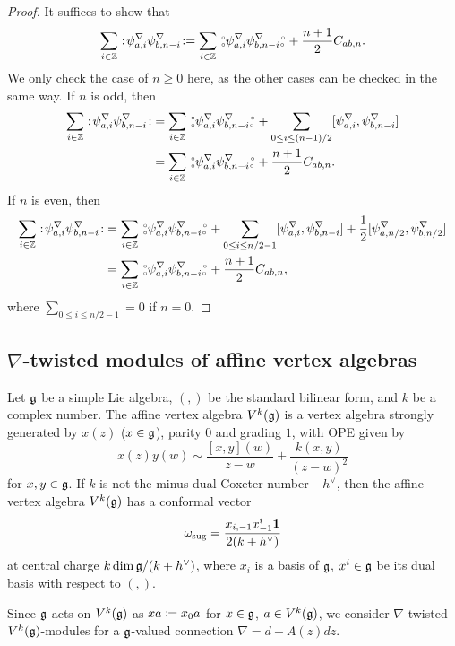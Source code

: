 \documentclass[final,reqno]{amsart}
\begin{document}
\begin{proof}
    It suffices to show that 
    \[
        \sum_{i\in\mathbb{Z}}:\!\psi^\nabla_{a,i}\psi^\nabla_{b,n-i}\!:=\sum_{i\in\mathbb{Z}}\,\substack{\scriptscriptstyle\circ \\ \scriptscriptstyle\circ} \psi^\nabla_{a,i}\psi^\nabla_{b,n-i} \substack{\scriptscriptstyle\circ \\ \scriptscriptstyle\circ\,}+\frac{n+1}{2}C_{ab,n}.
    \]    
    We only check the case of $n\geq 0$ here, as the other cases can be checked in the same way. If $n$ is odd, then
    \begin{align*}
        \sum_{i\in\mathbb{Z}}:\!\psi^\nabla_{a,i}\psi^\nabla_{b,n-i}\!:
        &=\sum_{i\in\mathbb{Z}}\,\substack{\scriptscriptstyle\circ \\ \scriptscriptstyle\circ} \psi^\nabla_{a,i}\psi^\nabla_{b,n-i} \substack{\scriptscriptstyle\circ \\ \scriptscriptstyle\circ\,}+\sum_{0\leq i\leq (n-1)/2}[\psi^\nabla_{a,i},\psi^\nabla_{b,n-i}]\\
        &=\sum_{i\in\mathbb{Z}}\,\substack{\scriptscriptstyle\circ \\ \scriptscriptstyle\circ} \psi^\nabla_{a,i}\psi^\nabla_{b,n-i} \substack{\scriptscriptstyle\circ \\ \scriptscriptstyle\circ\,}+\frac{n+1}{2}C_{ab,n}.
    \end{align*}
    If $n$ is even, then
    \begin{align*}
        \sum_{i\in\mathbb{Z}}:\!\psi^\nabla_{a,i}\psi^\nabla_{b,n-i}\!:
        &=\sum_{i\in\mathbb{Z}}\,\substack{\scriptscriptstyle\circ \\ \scriptscriptstyle\circ} \psi^\nabla_{a,i}\psi^\nabla_{b,n-i} \substack{\scriptscriptstyle\circ \\ \scriptscriptstyle\circ\,}+\sum_{0\leq i\leq n/2-1}[\psi^\nabla_{a,i},\psi^\nabla_{b,n-i}]+\frac{1}{2}[\psi^\nabla_{a,n/2},\psi^\nabla_{b,n/2}]\\
        &=\sum_{i\in\mathbb{Z}}\,\substack{\scriptscriptstyle\circ \\ \scriptscriptstyle\circ} \psi^\nabla_{a,i}\psi^\nabla_{b,n-i} \substack{\scriptscriptstyle\circ \\ \scriptscriptstyle\circ\,}+\frac{n+1}{2}C_{ab,n},
    \end{align*}
    where $\sum_{0\leq i\leq n/2-1}=0$ if $n=0$.
\end{proof}

\subsection{$\nabla$-twisted modules of affine vertex algebras}\label{ss:affine va}
\begin{dfn}
    Let $\mathfrak{g}$ be a simple Lie algebra, $(,)$ be the standard bilinear form, and $k$ be a complex number. The affine vertex algebra $V^k(\mathfrak{g})$ is a vertex algebra strongly generated by $x(z)$ ($x\in\mathfrak{g}$), parity $0$ and grading $1$, with OPE given by
    \[
        x(z)y(w)\sim \frac{[x,y](w)}{z-w}+\frac{k(x,y)}{(z-w)^2}
    \]
    for $x,y\in\mathfrak{g}$. If $k$ is not the minus dual Coxeter number $-h^\vee$, then the affine vertex algebra $V^k(\mathfrak{g})$ has a conformal vector 
    \[
        \omega_\mathrm{sug}=\frac{x_{i,-1}x^i_{-1}\mathbf{1}}{2(k+h^\vee)}
    \]
    at central charge $k\dim\mathfrak{g}/(k+h^\vee)$, where $x_i$ is a basis of $\mathfrak{g}$, $x^i\in\mathfrak{g}$ be its dual basis with respect to $(,)$.   
\end{dfn}

Since $\mathfrak{g}$ acts on $V^k(\mathfrak{g})$ as $xa\coloneqq x_0a$ for $x\in\mathfrak{g}$, $a\in V^k(\mathfrak{g})$, we consider $\nabla$-twisted $V^k(\mathfrak{g})$-modules for a $\mathfrak{g}$-valued connection $\nabla=d+A(z)dz$. 
\end{document}
